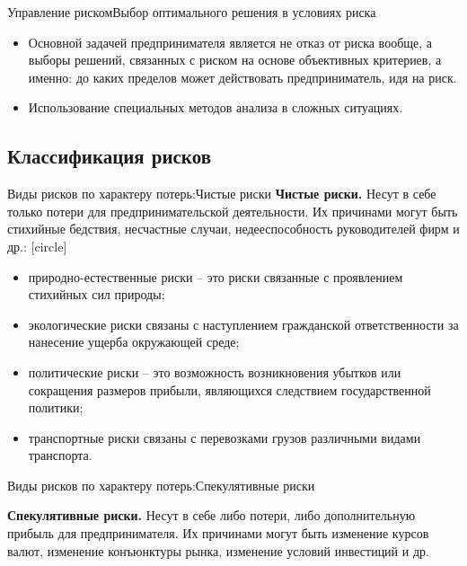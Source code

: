 \documentclass[financial_risks_lectures.tex]{subfiles}
\begin{document}
\begin{frame}{Управление риском}{Выбор оптимального решения в условиях риска}
  \begin{itemize}
  \item
	Основной задачей предпринимателя является не отказ от риска вообще, а выборы решений, связанных с риском на основе объективных критериев, а именно: до каких пределов может действовать предприниматель, идя на риск.
  \item
	Использование специальных методов анализа в сложных ситуациях.
  \end{itemize}
\end{frame}
\subsection{Классификация рисков}

\begin{frame}[shrink=10]{Виды рисков по характеру потерь:}{Чистые риски}
	\textbf{Чистые риски.} Несут в себе только потери для предпринимательской деятельности. Их причинами могут быть стихийные бедствия, несчастные случаи, недееспособность руководителей фирм и др.:
	[circle]
	\begin{itemize}
		\item<1-> {природно-естественные риски – это риски связанные с проявлением стихийных сил природы;
		}
		\item<2->{
экологические риски связаны с наступлением гражданской ответственности за нанесение ущерба окружающей среде;
}
  		\item<3-> {
политические риски – это возможность возникновения убытков или сокращения размеров прибыли, являющихся следствием государственной политики;
}
  		\item<4-> {
транспортные риски связаны с перевозками грузов различными видами транспорта.
}
	\end{itemize}  
\end{frame}

\begin{frame}{Виды рисков по характеру потерь:}{Спекулятивные риски}
\begin{block}{\textbf{Спекулятивные риски.}}
Несут в себе либо потери, либо дополнительную прибыль для предпринимателя. Их причинами могут быть изменение курсов валют, изменение конъюнктуры рынка, изменение условий инвестиций и др.
\end{block}
\end{frame}
\end{document}
